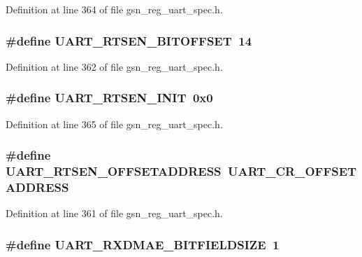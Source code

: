 Definition at line 364 of file gsn\_\-reg\_\-uart\_\-spec.h.

\hypertarget{a00575_ae4a317d264aae9737dcf7c55d8830489}{
\subsubsection[{UART\_\-RTSEN\_\-BITOFFSET}]{\setlength{\rightskip}{0pt plus 5cm}\#define UART\_\-RTSEN\_\-BITOFFSET~14}}
\label{a00575_ae4a317d264aae9737dcf7c55d8830489}


Definition at line 362 of file gsn\_\-reg\_\-uart\_\-spec.h.

\hypertarget{a00575_a26124bab5188dec95bad1ac5ba690c8a}{
\subsubsection[{UART\_\-RTSEN\_\-INIT}]{\setlength{\rightskip}{0pt plus 5cm}\#define UART\_\-RTSEN\_\-INIT~0x0}}
\label{a00575_a26124bab5188dec95bad1ac5ba690c8a}


Definition at line 365 of file gsn\_\-reg\_\-uart\_\-spec.h.

\hypertarget{a00575_ac96404e6223fe6c092a8d7adfd8ab3f0}{
\subsubsection[{UART\_\-RTSEN\_\-OFFSETADDRESS}]{\setlength{\rightskip}{0pt plus 5cm}\#define UART\_\-RTSEN\_\-OFFSETADDRESS~UART\_\-CR\_\-OFFSETADDRESS}}
\label{a00575_ac96404e6223fe6c092a8d7adfd8ab3f0}


Definition at line 361 of file gsn\_\-reg\_\-uart\_\-spec.h.

\hypertarget{a00575_a224059970fe5a7d296d03a60bd2ee4be}{
\subsubsection[{UART\_\-RXDMAE\_\-BITFIELDSIZE}]{\setlength{\rightskip}{0pt plus 5cm}\#define UART\_\-RXDMAE\_\-BITFIELDSIZE~1}}
\label{a00575_a224059970fe5a7d296d03a60bd2ee4be}


